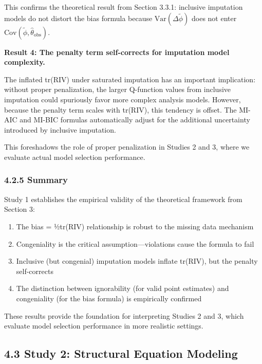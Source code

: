 \documentclass[
]{article}
\providecommand{\tightlist}{%
  \setlength{\itemsep}{0pt}\setlength{\parskip}{0pt}}
\begin{document}
This confirms the theoretical result from Section 3.3.1: inclusive
imputation models do not distort the bias formula because
\(\text{Var}(\Delta\tilde{\phi})\) does not enter
\(\text{Cov}(\tilde{\phi}, \hat{\theta}_{\text{obs}})\).

\textbf{Result 4: The penalty term self-corrects for imputation model
complexity.}

The inflated tr(RIV) under saturated imputation has an important
implication: without proper penalization, the larger Q-function values
from inclusive imputation could spuriously favor more complex analysis
models. However, because the penalty term scales with tr(RIV), this
tendency is offset. The MI-AIC and MI-BIC formulas automatically adjust
for the additional uncertainty introduced by inclusive imputation.

This foreshadows the role of proper penalization in Studies 2 and 3,
where we evaluate actual model selection performance.

\subsubsection{4.2.5 Summary}\label{summary}

Study 1 establishes the empirical validity of the theoretical framework
from Section 3:

\begin{enumerate}
\def\labelenumi{\arabic{enumi}.}
\tightlist
\item
  The bias = ½tr(RIV) relationship is robust to the missing data
  mechanism
\item
  Congeniality is the critical assumption---violations cause the formula
  to fail
\item
  Inclusive (but congenial) imputation models inflate tr(RIV), but the
  penalty self-corrects
\item
  The distinction between ignorability (for valid point estimates) and
  congeniality (for the bias formula) is empirically confirmed
\end{enumerate}

These results provide the foundation for interpreting Studies 2 and 3,
which evaluate model selection performance in more realistic settings.

\subsection{4.3 Study 2: Structural Equation
Modeling}\label{study-2-structural-equation-modeling}
\end{document}
